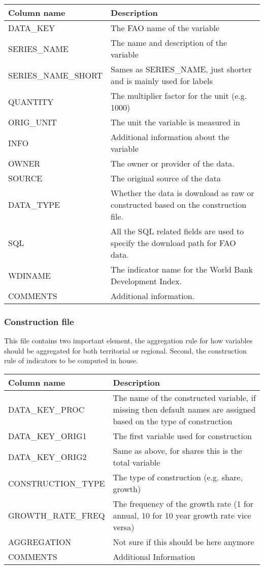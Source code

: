 \documentclass{article}\usepackage{graphicx, color}
\begin{document}
\begin{table}[!ht]
  \centering
  \begin{tabular}{l|p{8cm}}
    \hline
    Column name & Description\\
    \hline
    DATA\_KEY & The FAO name of the variable\\
    SERIES\_NAME & The name and description of the variable\\
    SERIES\_NAME\_SHORT & Sames as SERIES\_NAME, just shorter and is
    mainly used for labels\\
    QUANTITY & The multiplier factor for the unit (e.g. 1000)\\
    ORIG\_UNIT & The unit the variable is measured in\\
    INFO & Additional information about the variable\\
    OWNER & The owner or provider of the data.\\
    SOURCE & The original source of the data\\
    DATA\_TYPE & Whether the data is download as raw or constructed
    based on the construction file.\\
    SQL & All the SQL related fields are used to specify the download
    path for FAO data.\\
    WDINAME & The indicator name for the World Bank Development Index.\\
    COMMENTS & Additional information.\\
    \hline
  \end{tabular}
\end{table}


\subsubsection{Construction file}
This file contains two important element, the aggregation rule for how
variables should be aggregated for both territorial or regional. Second,
the construction rule of indicators to be computed in house.

\begin{table}[!ht]
  \centering
  \begin{tabular}{l|p{8cm}}
    \hline
    Column name & Description\\
    \hline
    DATA\_KEY\_PROC & The name of the constructed variable, if missing
    then default names are assigned based on the type of construction\\
    DATA\_KEY\_ORIG1 & The first variable used for construction\\
    DATA\_KEY\_ORIG2 & Same as above, for shares this is the total variable\\
    CONSTRUCTION\_TYPE & The type of construction (e.g. share, growth)\\
    GROWTH\_RATE\_FREQ & The frequency of the growth rate (1 for annual,
    10 for 10 year growth rate vice versa)\\
    AGGREGATION & Not sure if this should be here anymore\\
    COMMENTS & Additional Information\\
    \hline
  \end{tabular}
\end{table}
\end{document}
